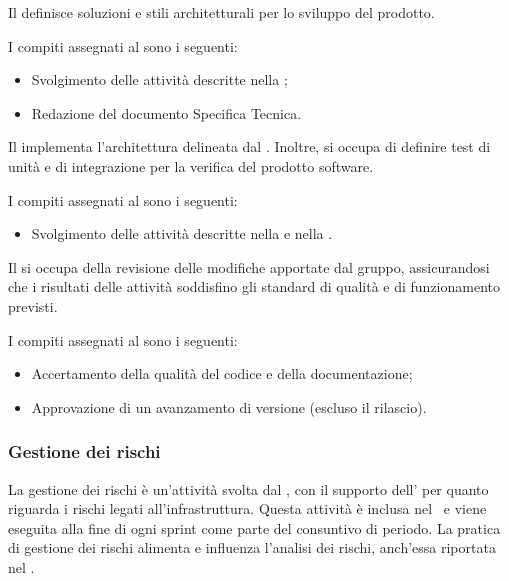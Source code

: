 \par Il \Progettista{} definisce soluzioni e stili architetturali per lo sviluppo del prodotto.
\par I compiti assegnati al \Progettista{} sono i seguenti:
\begin{itemize}
  \item Svolgimento delle attività descritte nella ;
  \item Redazione del documento Specifica Tecnica.
\end{itemize}

\par Il \Programmatore{} implementa l'architettura delineata dal \Progettista{}. Inoltre, si occupa di definire test di unità e di integrazione per la verifica del prodotto software.
\par I compiti assegnati al \Programmatore{} sono i seguenti:
\begin{itemize}
  \item Svolgimento delle attività descritte nella  e nella .
\end{itemize}

\par Il \Verificatore{} si occupa della revisione delle modifiche apportate dal gruppo, assicurandosi che i risultati delle attività soddisfino gli standard di qualità e di funzionamento previsti.
\par I compiti assegnati al \Verificatore{} sono i seguenti:
\begin{itemize}
  \item Accertamento della qualità del codice e della documentazione;
  \item Approvazione di un avanzamento di versione (escluso il rilascio).
\end{itemize}

\subsubsection{Gestione dei rischi}
\par La gestione dei rischi è un’attività svolta dal \Responsabile{}, con il supporto dell’\Amministratore{} per quanto riguarda i rischi legati all’infrastruttura. Questa attività è inclusa nel \PianoDiProgetto\ e viene eseguita alla fine di ogni sprint come parte del consuntivo di periodo. La pratica di gestione dei rischi alimenta e influenza l’analisi dei rischi, anch’essa riportata nel \PianoDiProgetto.

